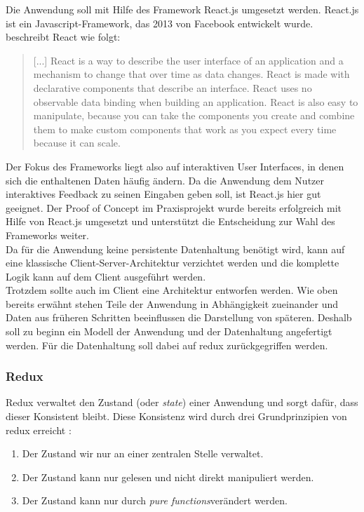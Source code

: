 Die Anwendung soll mit Hilfe des Framework React.js umgesetzt werden. React.js ist ein Javascript-Framework, das 2013 von Facebook entwickelt wurde. \cite{gackenheimer2015react} beschreibt React wie folgt:

\begin{quote}
[...] React is a way to describe the user interface of an application and a mechanism to change that over time as data changes. React is made with declarative components that describe an interface. React uses no observable data binding when building an application. React is also easy to manipulate, because you can take the components you create and combine them to make custom components that work as you expect every time because it can scale.
\end{quote}

Der Fokus des Frameworks liegt also auf interaktiven User Interfaces, in denen sich die enthaltenen Daten häufig ändern. Da die Anwendung dem Nutzer interaktives Feedback zu seinen Eingaben geben soll, ist React.js hier gut geeignet. Der Proof of Concept im Praxisprojekt wurde bereits erfolgreich mit Hilfe von React.js umgesetzt und unterstützt die Entscheidung zur Wahl des Frameworks weiter. \\

Da für die Anwendung keine persistente Datenhaltung benötigt wird, kann auf eine klassische Client-Server-Architektur verzichtet werden und die komplette Logik kann auf dem Client ausgeführt werden.\\
Trotzdem sollte auch im Client eine Architektur entworfen werden. Wie oben bereits erwähnt stehen Teile der Anwendung in Abhängigkeit zueinander und Daten aus früheren Schritten beeinflussen die Darstellung von späteren\footnotemark[1]. Deshalb soll zu beginn ein Modell der Anwendung und der Datenhaltung angefertigt werden. Für die Datenhaltung soll dabei auf redux zurückgegriffen werden.

\subsubsection{Redux}
Redux verwaltet den Zustand (oder \textit{state}) einer Anwendung und sorgt dafür, dass dieser Konsistent bleibt. Diese Konsistenz wird durch drei Grundprinzipien von redux erreicht \cite{threeprinciplesredux}:

\begin{enumerate}
  \item Der Zustand wir nur an einer zentralen Stelle verwaltet.
  \item Der Zustand kann nur gelesen und nicht direkt manipuliert werden.
  \item Der Zustand kann nur durch \textit{pure functions}\footnotemark[2] verändert werden.
\end{enumerate}

